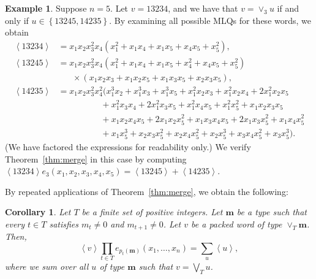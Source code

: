 \documentclass[reqno]{amsart}
\newcommand{\0}{\phantom{c}}
\newcommand{\swt}[1]{\left\langle #1 \right\rangle} %
\newcommand{\merge}[1]{\vee_{#1}} %
\newcommand{\mm}{\mathbf{m}}
\let\sumnonlimits\sum
\let\prodnonlimits\prod
\renewcommand{\sum}{\sumnonlimits\limits}
\renewcommand{\prod}{\prodnonlimits\limits}
\newcommand{\set}[1]{\left\{ #1 \right\}}
\theoremstyle{plain}
\newtheorem{cor}[thm]{Corollary}
\theoremstyle{definition}
\newtheorem{example}[thm]{Example}
\numberwithin{equation}{section}
\begin{document}
\begin{example}
\label{ex:checking_merge_thm}
Suppose $n = 5$.
Let $v = 13234$, and we have that $v = \merge{3} u$ if and only if $u \in \set{13245, 14235}$.
By examining all possible MLQs for these words, we obtain
\begin{align*}
\swt{13234} & = x_1 x_2 x_3^2 x_4 (x_1^2 + x_1 x_4 + x_1 x_5 + x_4 x_5 + x_5^2),
\\ \swt{13245} & = x_1 x_2 x_3^2 x_4 (x_1^2 + x_1x_4 + x_1x_5 + x_4^2 + x_4x_5 + x_5^2)
\\ & \hspace{20pt} \times (x_1x_2x_3 + x_1x_2x_5+x_1x_3x_5+x_2x_3x_5),
\\ \swt{14235} & = x_1x_2x_3^2x_4^2 (x_1^3x_2 + x_1^3x_3 + x_1^3x_5 + x_1^2x_2x_3 + x_1^2x_2x_4 + 2x_1^2x_2x_5
\\ & \hspace{60pt} + x_1^2x_3x_4 + 2x_1^2x_3x_5 + x_1^2x_4x_5 + x_1^2x_5^2 + x_1x_2x_3x_5
\\ & \hspace{60pt} + x_1x_2x_4x_5 + 2x_1x_2x_5^2 + x_1x_3x_4x_5 + 2x_1x_3x_5^2 + x_1x_4x_5^2
\\ & \hspace{60pt} + x_1x_5^3 + x_2x_3x_5^2 + x_2x_4x_5^2 + x_2x_5^3 + x_3x_4x_5^2 + x_3x_5^3).
\end{align*}
(We have factored the expressions for readability only.)
We verify Theorem~\ref{thm:merge} in this case by computing $\swt{13234} e_3(x_1, x_2, x_3, x_4, x_5) = \swt{13245} + \swt{14235}$.
\end{example}

By repeated applications of Theorem~\ref{thm:merge}, we obtain the following:

\begin{cor}
\label{cor:merges}
  Let $T$ be a finite set of positive integers.
  Let $\mm$ be a type such that every $t \in T$ satisfies
  $m_t \neq 0$ and $m_{t+1} \neq 0$.
  Let $v$ be a packed word of type $\merge{T}\mm$.
  Then,
  \[
  \swt{v} \prod_{t \in T} e_{p_t(\mm)}(x_1, \dotsc, x_n) = \sum_u \swt{u},
  \]
where we sum over all $u$ of type $\mm$ such that $v = \bigvee_T u$.
\end{cor}
\end{document}
